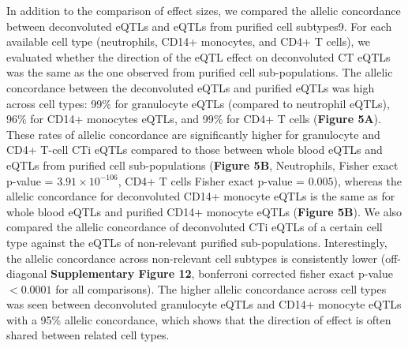 In addition to the comparison of effect sizes, we compared the allelic concordance between deconvoluted eQTLs and eQTLs from purified cell subtypes9. For each available cell type (neutrophils, CD14+ monocytes, and CD4+ T cells), we evaluated whether the direction of the eQTL effect on deconvoluted CT eQTLs was the same as the one observed from purified cell sub-populations. The allelic concordance between the deconvoluted eQTLs and purified eQTLs was high across cell types: 99\% for granulocyte eQTLs (compared to neutrophil eQTLs), 96\% for CD14+ monocytes eQTLs, and 99\% for CD4+ T cells (\textbf{Figure 5A}). These rates of allelic concordance are significantly higher for granulocyte and CD4+ T-cell CTi eQTLs compared to those between whole blood eQTLs and eQTLs from purified cell sub-populations (\textbf{Figure 5B}, Neutrophils, Fisher exact p-value = $3.91 \times 10^{-106}$, CD4+ T cells Fisher exact p-value = $0.005$),  whereas the allelic concordance for deconvoluted CD14+ monocyte eQTLs is the same as for whole blood eQTLs and purified CD14+ monocyte eQTLs (\textbf{Figure 5B}). We also compared the allelic concordance of deconvoluted CTi eQTLs of a certain cell type against the eQTLs of non-relevant purified sub-populations. Interestingly, the allelic concordance across non-relevant cell subtypes is consistently lower (off-diagonal \textbf{Supplementary Figure 12}, bonferroni corrected fisher exact p-value $< 0.0001$ for all comparisons). The higher allelic concordance across cell types was seen between deconvoluted granulocyte eQTLs and CD14+ monocyte eQTLs with a 95\% allelic concordance, which shows that the direction of effect is often shared between related cell types.

